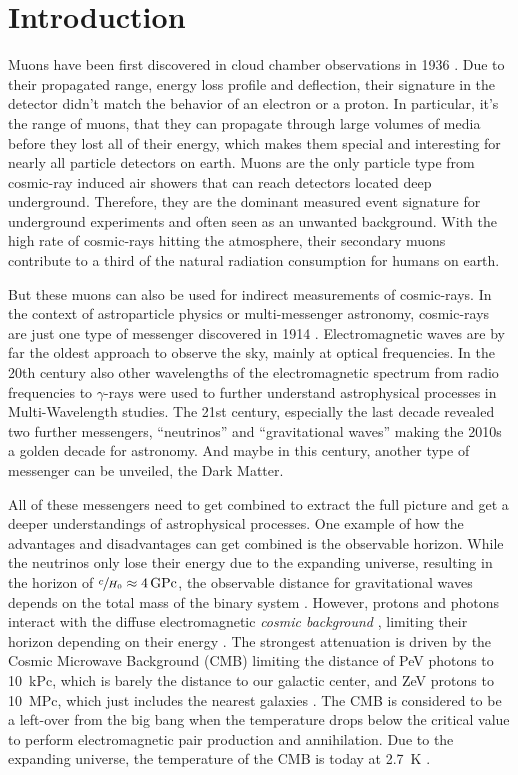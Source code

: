 \chapter{Introduction}

Muons have been first discovered in cloud chamber observations in 1936 \cite{Anderson36Muon}.
Due to their propagated range, energy loss profile and deflection, their signature in the detector didn't match the behavior of an electron or a proton.
In particular, it's the range of muons, that they can propagate through large volumes of media before they lost all of their energy, which makes them special and interesting for nearly all particle detectors on earth.
Muons are the only particle type from cosmic-ray induced air showers that can reach detectors located deep underground.
Therefore, they are the dominant measured event signature for underground experiments and often seen as an unwanted background.
With the high rate of cosmic-rays hitting the atmosphere, their secondary muons contribute to a third of the natural radiation consumption for humans on earth.

But these muons can also be used for indirect measurements of cosmic-rays.
In the context of astroparticle physics or multi-messenger astronomy, cosmic-rays are just one type of messenger discovered in 1914 \cite{Hess12CRbirth}.
Electromagnetic waves are by far the oldest approach to observe the sky, mainly at optical frequencies.
In the 20th century also other wavelengths of the electromagnetic spectrum from radio frequencies to $\gamma$-rays were used to further understand astrophysical processes in Multi-Wavelength studies.
The 21st century, especially the last decade revealed two further messengers, \enquote{neutrinos} and \enquote{gravitational waves} making the 2010s a golden decade for astronomy.
And maybe in this century, another type of messenger can be unveiled, the Dark Matter.

All of these messengers need to get combined to extract the full picture and get a deeper understandings of astrophysical processes.
One example of how the advantages and disadvantages can get combined is the observable horizon.
While the neutrinos only lose their energy due to the expanding universe, resulting in the horizon of $\sfrac{c}{H_0}\approx\SI{4}{GPc}$, the observable distance for gravitational waves depends on the total mass of the binary system \cite{LIGO20WhitePaper}.
However, protons and photons interact with the diffuse electromagnetic \textit{cosmic background} \cite{Hill18CosmicBg}, limiting their horizon depending on their energy \cite{Desiati06}.
The strongest attenuation is driven by the Cosmic Microwave Background (CMB) limiting the distance of PeV photons to \SI{10}{kPc}, which is barely the distance to our galactic center, and ZeV protons to \SI{10}{MPc}, which just includes the nearest galaxies \cite{DeAngelis13Horizon}.
The CMB is considered to be a left-over from the big bang when the temperature drops below the critical value to perform electromagnetic pair production and annihilation.
Due to the expanding universe, the temperature of the CMB is today at \SI{2.7}{K} \cite{PDG20}.

